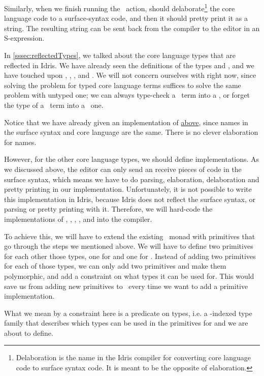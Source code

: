 Similarly, when we finish running the \Elab\ action,  should
delaborate\footnote{Delaboration is the name in the Idris compiler for
converting core language code to surface syntax code. It is meant to be the
opposite of elaboration.} the core language code to a surface-syntax code, and
then it should pretty print it as a string. The resulting string can be sent
back from the compiler to the editor in an S-expression.

In \autoref{sssec:reflectedTypes}, we talked about the core language types that
are reflected in Idris.  We have already seen the definitions of the types
 and , and we have touched upon , ,
, and .
We will not concern ourselves with  right now, since solving the
problem for typed core language terms suffices to solve the same problem with
untyped one; we can always type-check a \Raw\ term into a \TT, or forget the
type of a \TT\ term into a \Raw\ one.

Notice that we have already given an  implementation of
 \hyperref[code:ttnameEditorable]{above}, since names in the
surface syntax and core language are the same. There is no clever elaboration
for names.

However, for the other core language types, we should define 
implementations. As we discussed above, the editor can only send an receive
pieces of code in the surface syntax, which means we have to do parsing,
elaboration, delaboration and pretty printing in our 
implementation.
Unfortunately, it is not possible to write this implementation in Idris,
because Idris does not reflect the surface syntax, or parsing or pretty
printing with it.
Therefore, we will hard-code the implementations of , ,
, , and  into the compiler.

To achieve this, we will have to extend the existing \Elab\ monad with
primitives that go through the steps we mentioned above. We will have to define
two primitives for each other those types, one for  and one for
. Instead of adding two primitives for each of those types, we can
only add two primitives and make them polymorphic, and add a constraint on what
types it can be used for. This would save us from adding new primitives to
\Elab\ every time we want to add a primitive  implementation.

What we mean by a constraint here is a predicate on types,
i.e. a -indexed type family that describes which types can be used in
the primitives for  and  we are about to define.


